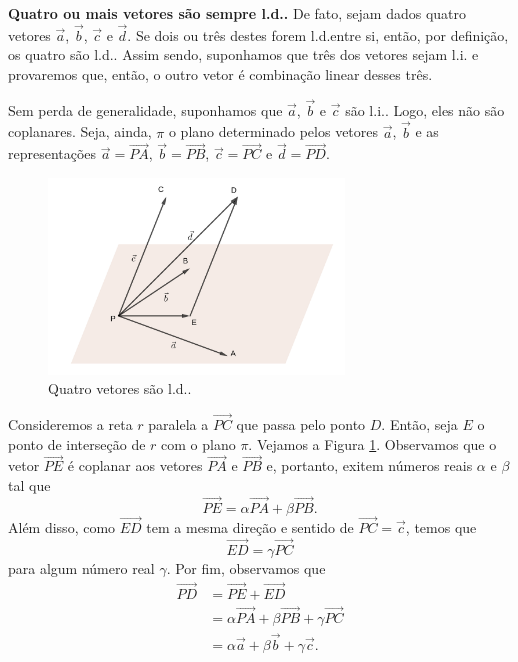 {\bf Quatro ou mais vetores são sempre l.d..} De fato, sejam dados quatro vetores $\vec{a}$, $\vec{b}$, $\vec{c}$ e $\vec{d}$. Se dois ou três destes forem l.d.entre si, então, por definição, os quatro são l.d.. Assim sendo, suponhamos que três dos vetores sejam l.i. e provaremos que, então, o outro vetor é combinação linear desses três.

Sem perda de generalidade, suponhamos que $\vec{a}$, $\vec{b}$ e $\vec{c}$ são l.i.. Logo, eles não são coplanares. Seja, ainda, $\pi$ o plano determinado pelos vetores $\vec{a}$, $\vec{b}$ e as representações $\vec{a}=\overrightarrow{PA}$, $\vec{b}=\overrightarrow{PB}$, $\vec{c}=\overrightarrow{PC}$ e $\vec{d}=\overrightarrow{PD}$.

\begin{figure}[H]
  \centering
  \includegraphics[width=0.7\textwidth]{./cap_base/dados/fig_4vec_ld/fig_4vec_ld}
  \caption{Quatro vetores são l.d..}
  \label{fig:4vec_ld}
\end{figure}

Consideremos a reta $r$ paralela a $\overrightarrow{PC}$ que passa pelo ponto $D$. Então, seja $E$ o ponto de interseção de $r$ com o plano $\pi$. Vejamos a Figura \ref{fig:4vec_ld}. Observamos que o vetor $\overrightarrow{PE}$ é coplanar aos vetores $\overrightarrow{PA}$ e $\overrightarrow{PB}$ e, portanto, exitem números reais $\alpha$ e $\beta$ tal que
\begin{equation}
  \overrightarrow{PE} = \alpha\overrightarrow{PA} + \beta\overrightarrow{PB}.
\end{equation}
Além disso, como $\overrightarrow{ED}$ tem a mesma direção e sentido de $\overrightarrow{PC} = \vec{c}$, temos que
\begin{equation}
  \overrightarrow{ED} = \gamma\overrightarrow{PC}
\end{equation}
para algum número real $\gamma$. Por fim, observamos que
\begin{align*}
  \overrightarrow{PD} &= \overrightarrow{PE} + \overrightarrow{ED}\\
                      &= \alpha\overrightarrow{PA} + \beta\overrightarrow{PB} + \gamma\overrightarrow{PC}\\
                      &= \alpha\vec{a} + \beta\vec{b} + \gamma\vec{c}.
\end{align*}

